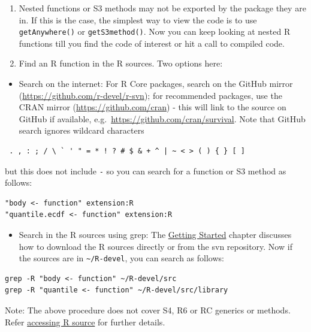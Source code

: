 \documentclass[
]{book}
\providecommand{\tightlist}{%
  \setlength{\itemsep}{0pt}\setlength{\parskip}{0pt}}
\begin{document}
\begin{enumerate}
\def\labelenumi{\arabic{enumi}.}
\setcounter{enumi}{1}
\item
  Nested functions or S3 methods may not be exported by the package they are in. If this is the case, the simplest way to view the code is to use \texttt{getAnywhere()} or \texttt{getS3method()}. Now you can keep looking at nested R functions till you find the code of interest or hit a call to compiled code.
\item
  Find an R function in the R sources. Two options here:
\end{enumerate}

\begin{itemize}
\tightlist
\item
  Search on the internet: For R Core packages, search on the GitHub mirror (\url{https://github.com/r-devel/r-svn}); for recommended packages, use the CRAN mirror (\url{https://github.com/cran}) - this will link to the source on GitHub if available, e.g.~\url{https://github.com/cran/survival}. Note that GitHub search ignores wildcard characters
\end{itemize}

\begin{verbatim}
 . , : ; / \ ` ' " = * ! ? # $ & + ^ | ~ < > ( ) { } [ ]
\end{verbatim}

but this does not include \texttt{-} so you can search for a function or S3 method as follows:

\begin{verbatim}
"body <- function" extension:R
"quantile.ecdf <- function" extension:R
\end{verbatim}

\begin{itemize}
\tightlist
\item
  Search in the R sources using grep: The \hyperref[GetStart]{Getting Started} chapter discusses how to download the R sources directly or from the svn repository. Now if the sources are in \texttt{\textasciitilde{}/R-devel}, you can search as follows:
\end{itemize}

\begin{verbatim}
grep -R "body <- function" ~/R-devel/src
grep -R "quantile <- function" ~/R-devel/src/library
\end{verbatim}

Note: The above procedure does not cover S4, R6 or RC generics or methods. Refer \href{https://github.com/jennybc/access-r-source}{accessing R source} for further details.
\end{document}
